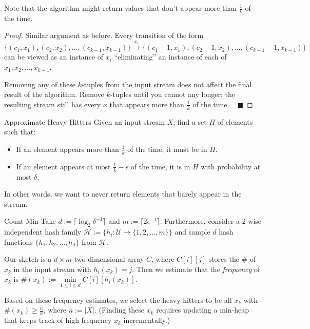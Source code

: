\begin{remark}
    Note that the algorithm might return values that don't appear more than $\frac{1}{k}$ of the time.
\end{remark}

\begin{proof}
    Similar argument as before.  Every transition of the form
    \[ \{(c_1, x_1), (c_2, x_2), \dots, (c_{k - 1}, x_{k - 1})\} \stackrel{x_i}{\longrightarrow} \{(c_1 - 1, x_1), (c_2 - 1, x_2), \dots, (c_{k - 1} - 1, x_{k - 1})\} \]
    can be viewed as an instance of $x_i$ ``eliminating'' an instance of each of $x_1, x_2, \dots, x_{k - 1}$.

    Removing any of these $k$-tuples from the input stream does not affect the final result of the algorithm.  Remove $k$-tuples until you cannot any longer; the resulting stream still has every $x$ that appears more than $\frac{1}{k}$ of the time. ~ $\blacksquare$
\end{proof}

\begin{problem}{Approximate Heavy Hitters}
    Given an input stream $X$, find a set $H$ of elements such that:
    \begin{itemize}
        \item If an element appears more than $\frac{1}{k}$ of the time, it must be in $H$.
        \item If an element appears at most $\frac{1}{k} - \epsilon$ of the time, it is in $H$ with probability at most $\delta$.
    \end{itemize}
    In other words, we want to never return elements that barely appear in the stream.
\end{problem}

\begin{solution}{Count-Min}
    Take $d := \lceil \log_2 \delta^{-1} \rceil$ and $m := \lceil 2 \epsilon^{-1} \rceil$.  Furthermore, consider a $2$-wise independent hash family $\mathcal{H} := \{ h_i : \mathcal{U} \to \{1, 2, \dots, m\}\}$ and sample $d$ hash functions $\{h_1, h_2, \dots, h_d\}$ from $\mathcal{H}$.

    Our sketch is a $d \times m$ two-dimensional array $C$, where $C[i][j]$ stores the \# of $x_k$ in the input stream with $h_i(x_k) = j$.  Then we estimate that the \emph{frequency} of $x_k$ is $\#(x_k) := \underset{1 \leq i \leq d}{\min} C[i][h_i(x_k)]$.

    Based on these frequency estimates, we select the heavy hitters to be all $x_k$ with $\#(x_k) \geq \frac{n}{k}$, where $n := |X|$.  (Finding these $x_k$ requires updating a min-heap that keeps track of high-frequency $x_k$ incrementally.)
\end{solution}

